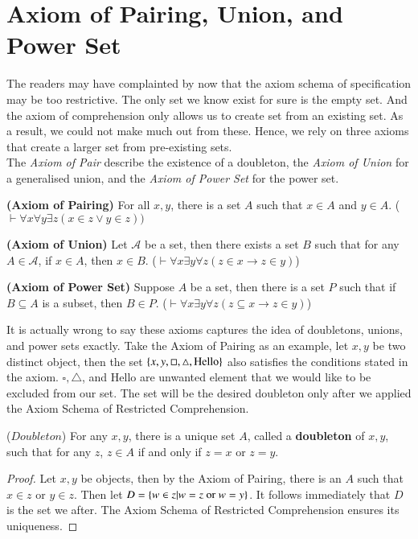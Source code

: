 \section{Axiom of Pairing, Union, and Power Set} 
The readers may have complainted by now that the axiom schema of specification may be too restrictive. The only set we know exist for sure is the empty set. And the axiom of comprehension only allows us to create set from an existing set. As a result, we could not make much out from these. Hence, we rely on three axioms that create a larger set from pre-existing sets.\\
The \textit{Axiom of Pair} describe the existence of a doubleton, the \textit{Axiom of Union} for a generalised union, and the \textit{Axiom of Power Set} for the power set.
\begin{ax}
    \textbf{(Axiom of Pairing)} For all $x,y$, there is a set $A$ such that $x\in A$ and $y\in A$. ($\vdash \forall x\forall y\exists z (x\in z\vee y\in z))$
\end{ax}
\begin{ax}
    \textbf{(Axiom of Union)} Let $\mathscr A$ be a set, then there exists a set $B$ such that for any $A\in \mathscr A$, if $x\in A$, then $x\in B$. ($\vdash \forall x\exists y\forall z (z\in x\rightarrow z\in y)$)
\end{ax}
\begin{ax}
    \textbf{(Axiom of Power Set)} Suppose $A$ be a set, then there is a set $P$ such that if $B\subseteq A$ is a subset, then $B\in P$. ($\vdash \forall x\exists y\forall z (z\subseteq x\rightarrow z\in y)$)
\end{ax}
It is actually wrong to say these axioms captures the idea of doubletons, unions, and power sets exactly. Take the Axiom of Pairing as an example, let $x,y$ be two distinct object, then the set $\{x,y,\square, \triangle,\text{Hello}\}$ also satisfies the conditions stated in the axiom. $\square, \triangle$, and Hello are unwanted element that we would like to be excluded from our set. The set will be the desired doubleton only after we applied the Axiom Schema of Restricted Comprehension.
\begin{prop}
    ($Doubleton$) For any $x,y$, there is a unique set $A$, called a \textbf{doubleton} of $x,y$, such that for any $z$, $z\in A$ if and only if $z=x$ or $z=y$.
\end{prop}
\begin{proof}
    Let $x,y$ be objects, then by the Axiom of Pairing, there is an $A$ such that $x\in z$ or $y\in z$. Then let $D = \{w\in z| w=z\text{ or }w=y\}$. It follows immediately that $D$ is the set we after. The Axiom Schema of Restricted Comprehension ensures its uniqueness.
\end{proof}
